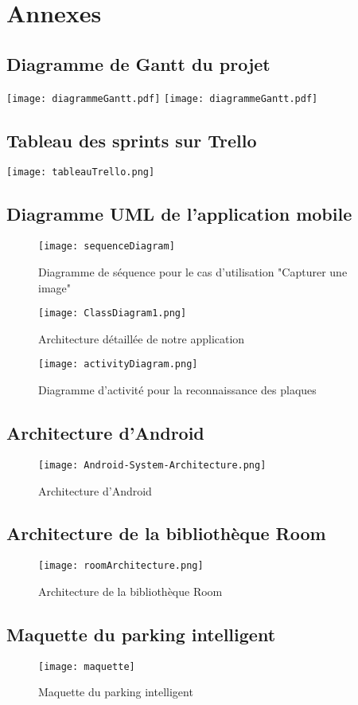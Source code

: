 \chapter{Annexes}
\section{Diagramme de Gantt du projet}
    \texttt{[image: diagrammeGantt.pdf]}
    \newpage
    \texttt{[image: diagrammeGantt.pdf]}
\section{Tableau des sprints sur Trello}
    \texttt{[image: tableauTrello.png]}

\section{Diagramme UML de l'application mobile}
    \begin{figure}[H]
        \centering
        \texttt{[image: sequenceDiagram]}
        \caption{Diagramme de séquence pour le cas d'utilisation "Capturer une image"}
        \label{fig:ds1}
    \end{figure}
    \begin{figure}[H]
        \centering
        \texttt{[image: ClassDiagram1.png]}
        \caption{Architecture détaillée de notre application}
        \label{fig:dc1}
    \end{figure}
    \begin{figure}[H]
        \centering
        \texttt{[image: activityDiagram.png]}
        \caption{Diagramme d'activité pour la reconnaissance des plaques}
        \label{fig:da1}
    \end{figure}

\section{Architecture d'Android}
\begin{figure}[H]
    \centering
    \texttt{[image: Android-System-Architecture.png]}
    \caption{Architecture d'Android}
\end{figure}

\section{Architecture de la bibliothèque Room}
\begin{figure}[H]
    \centering
    \texttt{[image: roomArchitecture.png]}
    \caption{Architecture de la bibliothèque Room}
    \label{fig:room}
\end{figure}
    
\section{Maquette du parking intelligent}
    \begin{figure}[H]
        \texttt{[image: maquette]}
        \caption{Maquette du parking intelligent}
        \label{fig:maquette}
    \end{figure}